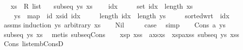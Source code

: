 \begin{isabellebody}
\ \ \ xs\ {\isacharcolon}{\kern0pt}{\isacharcolon}{\kern0pt}\ {\isachardoublequoteopen}R{}\ list{\isachardoublequoteclose}\isanewline
\ \ \ {\isachardoublequoteopen}subseq\ ys\ xs{\isachardoublequoteclose}\isanewline
\ \ \ {\isachardoublequoteopen}{\isasymexists}\ idx{\isachardot}{\kern0pt}\ \isanewline
\ \ \ \ set\ idx\ {\isasymsubseteq}\ {\isacharbraceleft}{\kern0pt}{\isachardot}{\kern0pt}{\isachardot}{\kern0pt}{\isacharless}{\kern0pt}length\ xs{\isacharbraceright}{\kern0pt}\ {\isasymand}\ \isanewline
\ \ \ \ ys\ {\isacharequal}{\kern0pt}\ map\ {\isacharparenleft}{\kern0pt}{\isasymlambda}\ id{\isachardot}{\kern0pt}\ xs{\isacharbang}{\kern0pt}id{\isacharparenright}{\kern0pt}\ idx\ {\isasymand}\isanewline
\ \ \ \ length\ idx\ {\isacharequal}{\kern0pt}\ length\ ys\ {\isasymand}\isanewline
\ \ \ \ sorted{\isacharunderscore}{\kern0pt}wrt\ {\isacharparenleft}{\kern0pt}{\isacharless}{\kern0pt}{\isacharparenright}{\kern0pt}\ idx{\isachardoublequoteclose}\isanewline
%
\isadelimproof
\ \ %
\endisadelimproof
%
\isatagproof
{}\isamarkupfalse%
\ assms\isanewline
{}\isamarkupfalse%
{\isacharparenleft}{\kern0pt}induction\ ys\ arbitrary{\isacharcolon}{\kern0pt}\ xs{\isacharparenright}{\kern0pt}\isanewline
\ \ \isamarkupfalse%
\ Nil\isanewline
\ \ \isamarkupfalse%
\ \isamarkupfalse%
\ {\isacharquery}{\kern0pt}case\ \isamarkupfalse%
\ simp\isanewline
{}\isamarkupfalse%
\isanewline
\ \ \isamarkupfalse%
\ {\isacharparenleft}{\kern0pt}Cons\ a\ ys{\isacharparenright}{\kern0pt}\isanewline
\ \ \isamarkupfalse%
\ {\isachardoublequoteopen}subseq\ ys\ xs{\isachardoublequoteclose}\ \isamarkupfalse%
\ {\isacharparenleft}{\kern0pt}metis\ subseq{\isacharunderscore}{\kern0pt}Cons{\isacharprime}{\kern0pt}{\isacharparenright}{\kern0pt}\isanewline
\ \ \isamarkupfalse%
\ xsp\ xss\ \ a{\isacharunderscore}{\kern0pt}xs{\isacharcolon}{\kern0pt}{\isachardoublequoteopen}xs\ {\isacharequal}{\kern0pt}\ xsp{\isacharat}{\kern0pt}a{\isacharhash}{\kern0pt}xss{\isachardoublequoteclose}\ {\isachardoublequoteopen}subseq\ ys\ xss{\isachardoublequoteclose}\ \isamarkupfalse%
\ Cons{\isacharparenleft}{\kern0pt}{}{\isacharparenright}{\kern0pt}\ list{\isacharunderscore}{\kern0pt}emb{\isacharunderscore}{\kern0pt}ConsD\isanewline
\ \ \ \ \isamarkupfalse%

\end{isabellebody}
